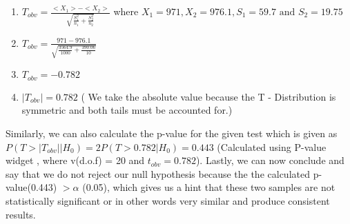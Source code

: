 \begin{enumerate}
    \item $T_{obv} = \frac{<X_1> - <X_2>}{\sqrt{\frac{S_1^2}{n_1} + \frac{S_2^2}{n_2}}}$ where $X_1 = 971, X_2 = 976.1, S_1 = 59.7 \text{ and } S_2 = 19.75$ 
    \item $T_{obv} = \frac{971 - 976.1}{\sqrt{\frac{3564.9}{1000} + \frac{390.06}{10}}}$
    \item $T_{obv} = - 0.782$
    \item $|T_{obv}| = 0.782$ ( We take the absolute value because the T - Distribution is symmetric and both tails must be accounted for.)
\end{enumerate}
Similarly, we can also calculate the p-value for the given test which is given as $P(T > |T_{obv}| | H_0) = 2P(T > 0.782 | H_0) = 0.443 $ (Calculated using P-value widget \cite{wolfram-pvalue}, where v(d.o.f) = 20 and $t_{obv} = 0.782$). Lastly, we can now conclude and say that we do not reject our null hypothesis because the the calculated p-value(0.443)  $> \alpha$ (0.05), which gives us a hint that these two samples are not statistically significant or in other words very similar and produce consistent results.